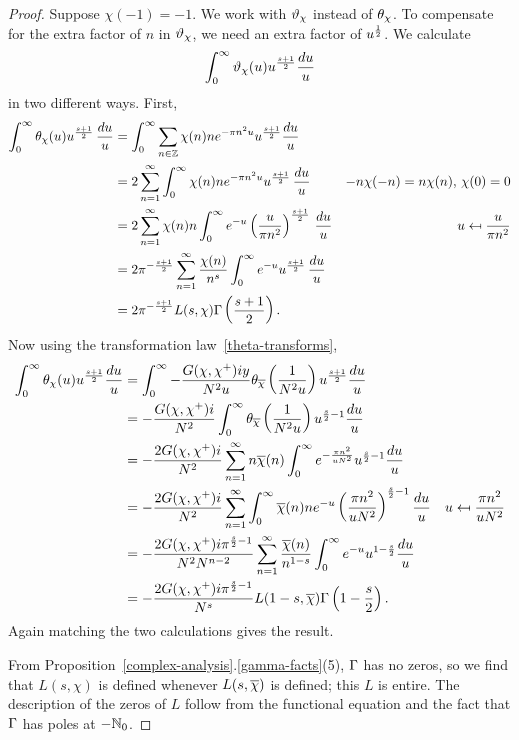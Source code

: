 \begin{proof}
 Suppose $\chi(-1)=-1$. We work with $\vartheta_{{\chi}}$ instead of $\theta_{\chi}$. To compensate for the extra factor of $n$ in $\vartheta_{\chi}$, we need an extra factor of $u^{\frac{1}{2}}$.  We calculate
\[
\int_0^{\infty} \vartheta_{\chi}(u) u^{\frac{s+1}2}\frac{du}{u}
\]
in two different ways. First,
\begin{align*}
\int_0^{\infty} \theta_{\chi}(u)u^{\frac{s+1}2} \,\frac{du}u
&=\int_0^{\infty} \sum_{n\in\mathbb{Z}} \chi(n) ne^{-\pi n^2u}u^{\frac {s+1}2}\frac{du}u\\
&=2\sum_{n=1}^{\infty} \int_0^{\infty} \chi(n) ne^{-\pi n^2u}u^{\frac{s+1}2}\,\frac{du}u&-n\chi(-n)=n\chi(n),\, \chi(0)=0\\
&=2\sum_{n=1}^{\infty} \chi(n)n\int_0^{\infty} e^{-u} \left( {\frac{u}{\pi n^2}} \right)^{\frac{s+1}2}\,\frac{du}u&u\mapsfrom \frac{u}{\pi n^2}\\
&=2\pi^{-\frac{s+1}2}\sum_{n=1}^{\infty} \frac{\chi(n)}{n^s}\int_0^{\infty} e^{-u} u^{\frac{s+1}2}\,\frac{du}u\\
&=2\pi^{-\frac{s+1}2} L(s,\chi)\Gamma\left( {\frac{s+1}{2}} \right).
\end{align*}
Now using the transformation law~\ref{theta-transforms},
\begin{align*}
\int_0^{\infty} \theta_{\chi}(u) u^{\frac{s+1}2}\frac{du}{u}
&=\int_0^{\infty} -\frac{G(\chi,\chi^+)iy}{N^2u} \theta_{\overline{\chi}} \left( {\frac{1}{N^2u}} \right) u^{\frac{s+1}2}\frac{du}u\\
&=-\frac{G(\chi,\chi^+)i}{N^2} \int_0^{\infty} \theta_{\overline{\chi}} \left( {\frac{1}{N^2u}} \right) u^{\frac s2-1}\frac{du}u\\
&=-\frac{2G(\chi,\chi^+)i}{N^2} \sum_{n=1}^{\infty}n\overline{\chi}(n)\int_0^{\infty}  e^{-\frac{\pi n^2}{uN^2}} u^{\frac s2-1}\frac{du}u\\
&=-\frac{2G(\chi,\chi^+)i}{N^2} \sum_{n=1}^{\infty}\int_0^{\infty} \overline{\chi}(n)n e^{-u} \left( {\frac{\pi n^2}{uN^2}} \right)^{\frac s2-1}\frac{du}u&u\mapsfrom \frac{\pi n^2}{uN^2}\\
&=-\frac{2G(\chi,\chi^+)i\pi^{\frac s2-1}}{N^2N^{n-2}} \sum_{n=1}^{\infty} \frac{\overline{\chi}(n)}{n^{1-s}}\int_0^{\infty}e^{-u} u^{1-\frac{s}{2}}\frac{du}{u}\\
&=-\frac{2G(\chi,\chi^+)i\pi^{\frac s2-1}}{N^s} L(1-s,\overline{\chi}) \Gamma\left( {1-\frac s2} \right). &\qedhere
\end{align*}
Again matching the two calculations gives the result.

From Proposition~\ref{complex-analysis}.\ref{gamma-facts}(5), $\Gamma$ has no zeros, so we find that $L(s,\chi)$ is defined whenever $L(s,\overline{\chi})$ is defined; this $L$ is entire. 
The description of the zeros of $L$ follow from the functional equation and the fact that $\Gamma$ has poles at $-\mathbb{N}_0$. %
\end{proof}
